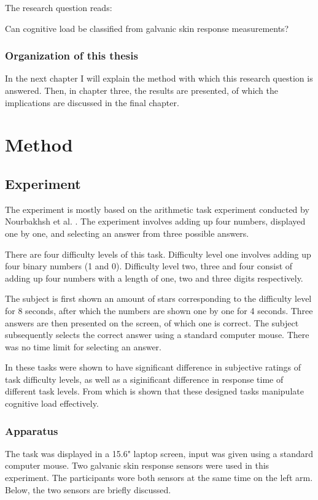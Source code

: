\documentclass[11pt,leqno,a4paper]{report} %
\begin{document}
The research question reads:

\begin{center}
Can cognitive load be classified from galvanic skin response measurements?
\end{center}


\subsection{Organization of this thesis}
In the next chapter I will explain the method with which this research question is answered. Then, in chapter three, the results are presented, of which the implications are discussed in the final chapter.

\chapter{Method}

\section{Experiment}
The experiment is mostly based on the arithmetic task experiment conducted by Nourbakhsh et al. \citep{Nourbakhsh2012}. The experiment involves adding up four numbers, displayed one by one, and selecting an answer from three possible answers.

There are four difficulty levels of this task. Difficulty level one involves adding up four binary numbers (1 and 0). Difficulty level two, three and four consist of adding up  four numbers with a length of one, two and three digits respectively.

The subject is first shown an amount of stars corresponding to the difficulty level for 8 seconds, after which the numbers are shown one by one for 4 seconds. Three answers are then presented on the screen, of which one is correct. The subject subsequently selects the correct answer using a standard computer mouse. There was no time limit for selecting an answer.

In \citep{Nourbakhsh2013} these tasks were shown to have significant difference in subjective ratings of task difficulty levels, as well as a siginificant difference in response time of different task levels. From which is shown that these designed tasks manipulate cognitive load effectively.


\subsection{Apparatus}
The task was displayed in a 15.6" laptop screen, input was given using a standard computer mouse.
Two galvanic skin response sensors were used in this experiment. The participants wore both sensors at the same time on the left arm. Below, the two sensors are briefly discussed.
\end{document}
